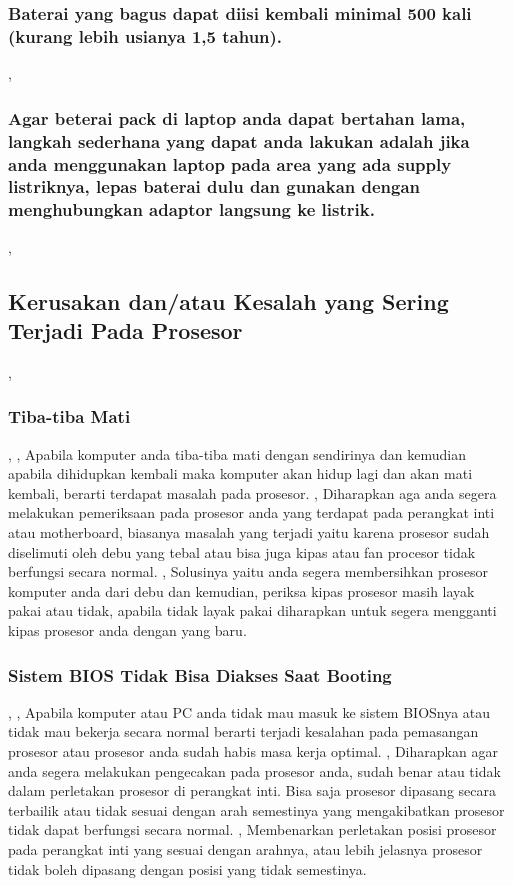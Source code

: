 	\subsubsection{Baterai yang bagus dapat diisi kembali minimal 500 kali (kurang lebih usianya 1,5 tahun).},
	\subsubsection{Agar beterai pack di laptop anda dapat bertahan lama, langkah sederhana yang dapat anda lakukan adalah jika
	anda menggunakan laptop pada area yang ada supply listriknya, lepas baterai dulu dan gunakan dengan menghubungkan adaptor 
	langsung ke listrik.},
	
\subsection{Kerusakan dan/atau Kesalah yang Sering Terjadi Pada Prosesor},

\subsubsection{Tiba-tiba Mati},
	,
Apabila komputer anda tiba-tiba mati dengan sendirinya dan kemudian apabila dihidupkan kembali maka komputer akan hidup lagi dan akan
mati kembali, berarti terdapat masalah pada prosesor.
	,
Diharapkan aga anda segera melakukan pemeriksaan pada prosesor anda yang terdapat pada perangkat inti atau motherboard, biasanya
masalah yang terjadi yaitu karena prosesor sudah diselimuti oleh debu yang tebal atau bisa juga kipas atau fan procesor tidak
berfungsi secara normal.
	,
Solusinya yaitu anda segera membersihkan prosesor komputer anda dari debu dan kemudian, periksa kipas prosesor masih layak pakai
atau tidak, apabila tidak layak pakai diharapkan untuk segera mengganti kipas prosesor anda dengan yang baru.

\subsubsection{Sistem BIOS Tidak Bisa Diakses Saat Booting},
	,
Apabila komputer atau PC anda tidak mau masuk ke sistem BIOSnya atau tidak mau bekerja secara normal berarti terjadi kesalahan pada
pemasangan prosesor atau prosesor anda sudah habis masa kerja optimal.
	,
Diharapkan agar anda segera melakukan pengecakan pada prosesor anda, sudah benar atau tidak dalam perletakan prosesor di perangkat
inti. Bisa saja prosesor dipasang secara terbailik atau tidak sesuai dengan arah semestinya yang mengakibatkan prosesor tidak dapat
berfungsi secara normal.
	,
Membenarkan perletakan posisi prosesor pada perangkat inti yang sesuai dengan arahnya, atau lebih jelasnya prosesor tidak boleh
dipasang dengan posisi yang tidak semestinya.

